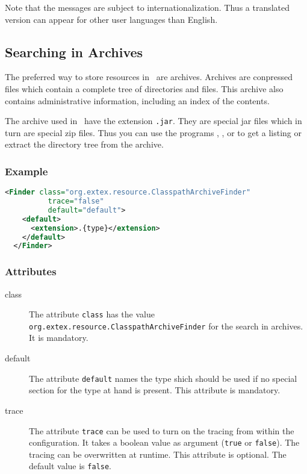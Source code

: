 Note that the messages are subject to internationalization. Thus a
translated version can appear for other user languages than English.


\subsection{Searching in Archives}

The preferred way to store resources in \ExTeX\ are archives. Archives
are conpressed files which contain a complete tree of directories and
files. This archive also contains administrative information,
including an index of the contents.

The archive used in \ExTeX\ have the extension \texttt{.jar}. They are
special jar files which in turn are special zip files. Thus you can
use the programs , , or  to get a
listing or extract the directory tree from the archive.

\subsubsection*{Example}

\begin{lstlisting}[language=XML]
  <Finder class="org.extex.resource.ClasspathArchiveFinder"
          trace="false"
          default="default">
    <default>
      <extension>.{type}</extension>
    </default>
  </Finder>
\end{lstlisting}

\subsubsection*{Attributes}
\begin{description}
\item[class] The attribute \texttt{class} has the value
  \texttt{org.extex.resource.ClasspathArchiveFinder} for the search in
  archives. It is mandatory.
\item[default] The attribute \texttt{default} names the type shich
  should be used if no special section for the type at hand is
  present. This attribute is mandatory.
\item[trace] The attribute \texttt{trace} can be used to turn on the
  tracing from within the configuration. It takes a boolean value as
  argument (\texttt{true} or \texttt{false}). The tracing can be
  overwritten at runtime. This attribute is optional. The default
  value is \texttt{false}.
\end{description}

